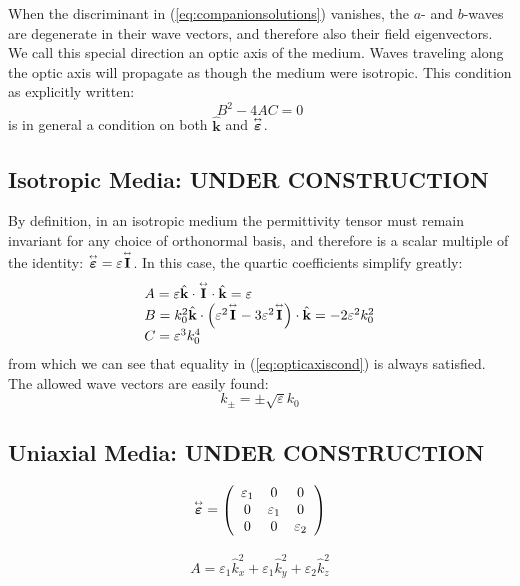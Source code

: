 \documentclass[11pt, reqno]{book}%
\newcounter{ct}
\newcommand{\es}{\begin{equation}}
\newcommand{\ef}{\end{equation} \vspace{0.05in}}
\newcommand{\mbf}{\mathbf}
\newcommand{\mbfg}[1]{\mbf{\mbox{\boldmath$#1$}}}
\newcommand{\mbfh}[1]{\hat{\mbf{#1}}}
\newcommand{\ve}{\varepsilon}
\newcommand{\tens}{\overset{\text{\tiny$\leftrightarrow$}}}
\newcommand{\clr}{\color{blue}}
\newcommand{\clb}{\color{black}}
\begin{document}
When the discriminant in (\ref{eq:companionsolutions}) vanishes, the $a$- and $b$-waves are degenerate in their wave vectors, and therefore also their field eigenvectors. We call this special direction an optic axis of the medium. Waves traveling along the optic axis will propagate as though the medium were isotropic. This condition as explicitly written:
\es
B^2-4AC = 0
\label{eq:opticaxiscond}
\ef
\noindent is in general a condition on both $\mbfh{k}$ and $\tens{\mbfg{\ve}}$.




\clr
\subsection{Isotropic Media: UNDER CONSTRUCTION}
\label{sec:isomedia}

By definition, in an isotropic medium the permittivity tensor must remain invariant for any choice of orthonormal basis, and therefore is a scalar multiple of the identity: $\tens{\mbfg{\ve}}=\ve\tens{\mbf{I}}$. In this case, the quartic coefficients simplify greatly:
\es
\begin{array}{l}
A = \ve \mbfh{k} \cdot \tens{\mbf{I}}\cdot \mbfh{k} = \ve \\
B=k^2_0 \mbfh{k}\cdot\left(\ve^2\tens{\mbf{I}}-3\ve^2\tens{\mbf{I}}\right)\cdot\mbfh{k} = -2\ve^2 k^2_0 \\
C=  \ve^3 k^4_0
\end{array}
\ef
\noindent from which we can see that equality in (\ref{eq:opticaxiscond}) is always satisfied. The allowed wave vectors are easily found:
\es
k_\pm = \pm \sqrt{\ve}k_0 
\ef


\clb

\clr
\subsection{Uniaxial Media: UNDER CONSTRUCTION}
\label{sec:unimedia}

\es
\tens{\mbfg{\ve}}=
\left(\begin{array}{ccc}
\ve_1 & 0 & 0 \\
0 & \ve_1 & 0 \\
0 & 0 &\ve_2
\end{array}\right)
\ef

\es
\begin{array}{l}
A = \ve_1 \hat{k}^2_x +\ve_1 \hat{k}^2_y +\ve_2 \hat{k}^2_z
\end{array}
\ef
\end{document}
